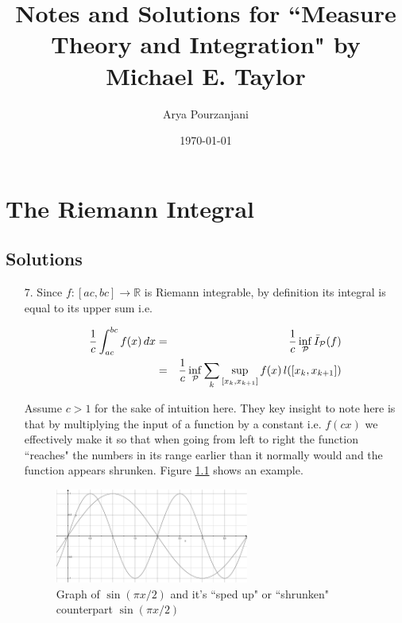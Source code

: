\documentclass[oneside]{book}
\begin{document}
\title{Notes and Solutions for ``Measure Theory and Integration" by Michael E. Taylor}
\author{Arya Pourzanjani} 
\date{\today}
\maketitle

\chapter{The Riemann Integral}

\section*{Solutions}
\begin{enumerate}
\item[7.] Since $f:[ac,bc]\to \mathbb{R}$ is Riemann integrable, by definition its integral is equal to its upper sum i.e.

\begin{eqnarray}
\label{eq:upperSumStretched}
\frac{1}{c}\int_{ac}^{bc} f(x)\,dx &=& \frac{1}{c} \inf_{\cal{P}} \bar{I}_{\cal{P}}(f) \nonumber \\
&=& \frac{1}{c} \inf_{\cal{P}} \sum_{k} \sup_{[x_k,x_{k+1}]} f(x)\, l([x_k,x_{k+1}])
\end{eqnarray}

Assume $c > 1$ for the sake of intuition here. They key insight to note here is that by multiplying the input of a function by a constant i.e. $f(cx)$ we effectively make it so that when going from left to right the function ``reaches" the numbers in its range earlier than it normally would and the function appears shrunken. Figure \ref{fig:sinSpedUp} shows an example.

\begin{figure}[h]
    \centering
    \includegraphics[width=0.6\textwidth]{sinSpeedUp.pdf}
    \caption{Graph of $\sin(\pi x/2)$ and it's ``sped up" or ``shrunken" counterpart $\sin(\pi x/2)$}
    \label{fig:sinSpedUp}
\end{figure}


\end{enumerate}
\end{document}
